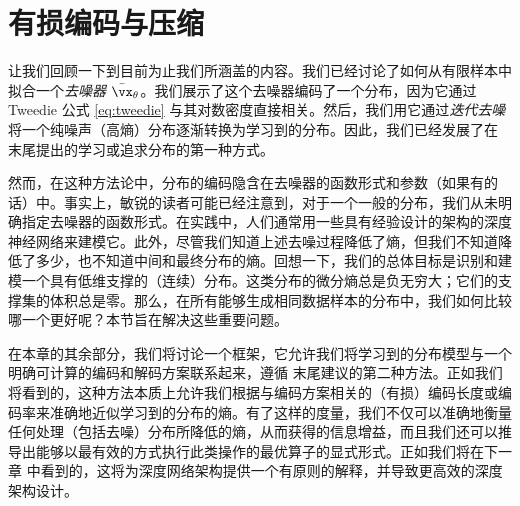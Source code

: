 \documentclass[../../book-main_zh.tex]{subfiles}
\begin{document}





\section{有损编码与压缩} \label{sec:lossy_compression}

让我们回顾一下到目前为止我们所涵盖的内容。我们已经讨论了如何从有限样本中拟合一个\textit{去噪器} \(\bar{\vx}_{\theta}\)。我们展示了这个去噪器编码了一个分布，因为它通过 Tweedie 公式 \eqref{eq:tweedie} 与其对数密度直接相关。然后，我们用它通过\textit{迭代去噪}将一个纯噪声（高熵）分布逐渐转换为学习到的分布。因此，我们已经发展了在  末尾提出的学习或追求分布的第一种方式。

然而，在这种方法论中，分布的编码隐含在去噪器的函数形式和参数（如果有的话）中。事实上，敏锐的读者可能已经注意到，对于一个一般的分布，我们从未明确指定去噪器的函数形式。在实践中，人们通常用一些具有经验设计的架构的深度神经网络来建模它。此外，尽管我们知道上述去噪过程降低了熵，但我们不知道降低了多少，也不知道中间和最终分布的熵。回想一下，我们的总体目标是识别和建模一个具有低维支撑的（连续）分布。这类分布的微分熵总是负无穷大；它们的支撑集的体积总是零。那么，在所有能够生成相同数据样本的分布中，我们如何比较哪一个更好呢？本节旨在解决这些重要问题。

在本章的其余部分，我们将讨论一个框架，它允许我们将学习到的分布模型与一个明确可计算的编码和解码方案联系起来，遵循  末尾建议的第二种方法。正如我们将看到的，这种方法本质上允许我们根据与编码方案相关的（有损）编码长度或编码率来准确地近似学习到的分布的熵。有了这样的度量，我们不仅可以准确地衡量任何处理（包括去噪）分布所降低的熵，从而获得的信息增益，而且我们还可以推导出能够以最有效的方式执行此类操作的最优算子的显式形式。正如我们将在下一章  中看到的，这将为深度网络架构提供一个有原则的解释，并导致更高效的深度架构设计。
\end{document}
